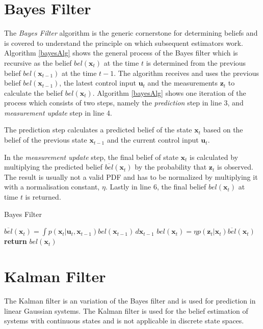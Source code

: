 \documentclass[12pt,oneside,openany,a4paper, %
afrikaans,english,
]{memoir}
\numberwithin{equation}{chapter}
\begin{document}
{\section{Bayes Filter}\label{sec:bayesFilter}
The \textit{Bayes Filter} algorithm is the generic cornerstone for determining beliefs and is covered to understand the principle on which subsequent estimators work. Algorithm \ref{bayesAlg} shows the general process of the Bayes filter which is recursive as the belief $bel(\bm{x}_{t})$ at the time $t$ is determined from the previous belief $bel(\bm{x}_{t-1})$ at the time $t-1$. The algorithm receives and uses the previous belief $bel(\bm{x}_{t-1})$, the latest control input $\bm{u}_t$ and the measurements $\bm{z}_t$ to calculate the belief $bel(\bm{x}_t)$. Algorithm \ref{bayesAlg} shows one iteration of the process which consists of two steps, namely the \textit{prediction} step in line 3, and \textit{measurement update} step in line 4.

The prediction step calculates a predicted belief of the state $\bm{x}_t$ based on the belief of the previous state $\bm{x}_{t-1}$ and the current control input $\bm{u}_t$.

In the \textit{measurement update} step, the final belief of state $\bm{x}_t$ is calculated by multiplying the predicted belief $\overline{bel}(\bm{x}_t)$ by the probability that $\bm{z}_t$ is observed. The result is usually not a valid PDF and has to be normalized by multiplying it with a normalisation constant, $\eta$. Lastly in line 6, the final belief $bel(\bm{x}_t)$ at time $t$ is returned.
\begin{algorithm}
\caption{Bayes Filter}\label{bayesAlg}
\begin{algorithmic}[1]
\State $\overline{bel}(\bm{x}_t) = \int p(\bm{x}_t|\bm{u}_t, \bm{x}_{t-1})bel(\bm{x}_{t-1})\, d\bm{x}_{t-1}$
\State $bel(\bm{x}_t) = \eta p(\bm{z}_t|\bm{x}_t) \overline{bel} (\bm{x}_t)$
\EndFor
\State \textbf{return} $bel(\bm{x}_t)$
\EndProcedure
\end{algorithmic}
\end{algorithm}

\section{Kalman Filter}
The Kalman filter is an variation of the Bayes filter and is used for prediction in linear Gaussian systems. The Kalman filter is used for the belief estimation of systems with continuous states and is not applicable in discrete state spaces. 
}
\end{document}
